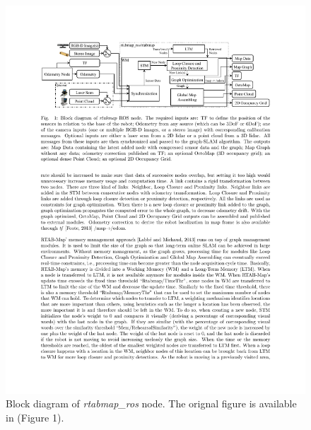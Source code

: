 \documentclass[10pt,journal,compsoc]{IEEEtran}
\begin{document}
\begin{figure}[thpb]
      \centering
      \includegraphics[width=\linewidth]{rtabmap_ros}
      \caption{Block diagram of \textit{rtabmap\_ros}  node. The orignal figure is available in \cite{labbertab} (Figure 1).}
      \label{fig:rtabmap_ros}
\end{figure}


%
%
%
%
%
%
\end{document}

